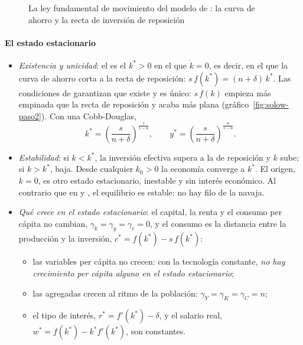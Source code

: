 \documentclass[11pt]{article}
\begin{document}
\begin{figure}[H]
\centering
\caption{La ley fundamental de movimiento del modelo de : la curva de ahorro y la recta de inversión de reposición}\label{fig:solow-paso1}
\end{figure}

\paragraph{El estado estacionario}

\begin{itemize}
\item \emph{Existencia y unicidad}: el  es el $k^*>0$ en el que $\dot k=0$, es decir, en el que la curva de ahorro corta a la recta de reposición: $s\,f(k^*)=(n+\delta)\,k^*$. Las condiciones de  garantizan que existe y es único: $s\,f(k)$ empieza más empinada que la recta de reposición y acaba más plana (gráfico~\ref{fig:solow-paso2}). Con una Cobb-Douglas,
  \[k^*=\left(\frac{s}{n+\delta}\right)^{\frac{1}{1-\alpha}},\qquad y^*=\left(\frac{s}{n+\delta}\right)^{\frac{\alpha}{1-\alpha}}.\]
\item \emph{Estabilidad}: si $k<k^*$, la inversión efectiva supera a la de reposición y $k$ sube; si $k>k^*$, baja. Desde cualquier $k_0>0$ la economía converge a $k^*$. El origen, $k=0$, es otro estado estacionario, inestable y sin interés económico. Al contrario que en  y , el equilibrio es estable: no hay filo de la navaja.
\item \emph{Qué crece en el estado estacionario}: el capital, la renta y el consumo per cápita no cambian, $\gamma_k=\gamma_y=\gamma_c=0$, y el consumo es la distancia entre la producción y la inversión, $c^*=f(k^*)-s\,f(k^*)$:
  \begin{itemize}
  \item las variables per cápita no crecen: con la tecnología constante, \emph{no hay crecimiento per cápita alguno en el estado estacionario};
  \item las agregadas crecen al ritmo de la población: $\gamma_Y=\gamma_K=\gamma_C=n$;
  \item el tipo de interés, $r^*=f'(k^*)-\delta$, y el salario real, $w^*=f(k^*)-k^*f'(k^*)$, son constantes.
  \end{itemize}
\end{itemize}
\end{document}
